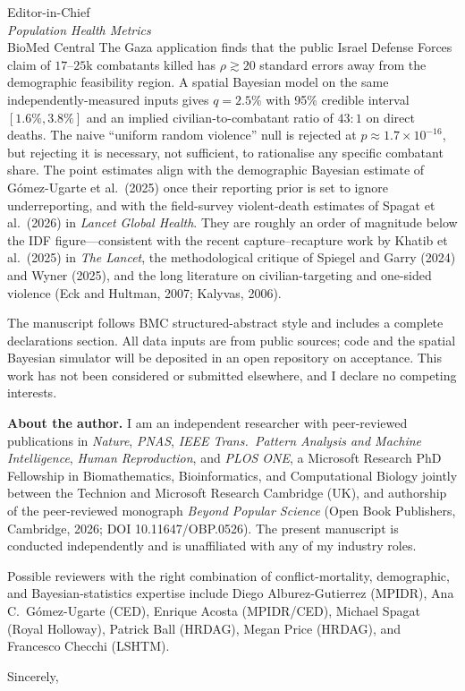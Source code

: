 \documentclass[11pt]{letter}
\begin{document}
\begin{letter}{Editor-in-Chief\\ \emph{Population Health Metrics}\\ BioMed Central}
The Gaza application finds that the public Israel Defense Forces claim of $17$--$25$k combatants killed has $\rho\gtrsim 20$ standard errors away from the demographic feasibility region. A spatial Bayesian model on the same independently-measured inputs gives $q=2.5\%$ with 95\% credible interval $[1.6\%,3.8\%]$ and an implied civilian-to-combatant ratio of $43{:}1$ on direct deaths. The naive ``uniform random violence'' null is rejected at $p\approx 1.7\times 10^{-16}$, but rejecting it is necessary, not sufficient, to rationalise any specific combatant share. The point estimates align with the demographic Bayesian estimate of G\'{o}mez-Ugarte et al.\ (2025) once their reporting prior is set to ignore underreporting, and with the field-survey violent-death estimates of Spagat et al.\ (2026) in \emph{Lancet Global Health}. They are roughly an order of magnitude below the IDF figure---consistent with the recent capture--recapture work by Khatib et al.\ (2025) in \emph{The Lancet}, the methodological critique of Spiegel and Garry (2024) and Wyner (2025), and the long literature on civilian-targeting and one-sided violence (Eck and Hultman, 2007; Kalyvas, 2006).

The manuscript follows BMC structured-abstract style and includes a complete declarations section. All data inputs are from public sources; code and the spatial Bayesian simulator will be deposited in an open repository on acceptance. This work has not been considered or submitted elsewhere, and I declare no competing interests.

\textbf{About the author.} I am an independent researcher with peer-reviewed publications in \emph{Nature}, \emph{PNAS}, \emph{IEEE Trans.\ Pattern Analysis and Machine Intelligence}, \emph{Human Reproduction}, and \emph{PLOS ONE}, a Microsoft Research PhD Fellowship in Biomathematics, Bioinformatics, and Computational Biology jointly between the Technion and Microsoft Research Cambridge (UK), and authorship of the peer-reviewed monograph \emph{Beyond Popular Science} (Open Book Publishers, Cambridge, 2026; DOI 10.11647/OBP.0526). The present manuscript is conducted independently and is unaffiliated with any of my industry roles.

Possible reviewers with the right combination of conflict-mortality, demographic, and Bayesian-statistics expertise include Diego Alburez-Gutierrez (MPIDR), Ana C.~G\'{o}mez-Ugarte (CED), Enrique Acosta (MPIDR/CED), Michael Spagat (Royal Holloway), Patrick Ball (HRDAG), Megan Price (HRDAG), and Francesco Checchi (LSHTM).

\closing{Sincerely,}

\end{letter}
\end{document}
